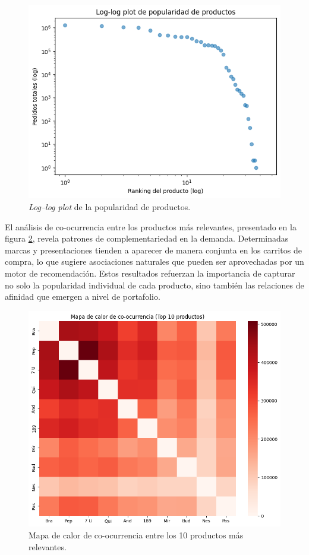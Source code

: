 \begin{figure}[htpb]
	\centering
	\includegraphics[scale=.65]{./Figures/log_log_plot.png}
	\caption{\textit{Log–log plot} de la popularidad de productos.}
	\label{fig:log_log_plot}
\end{figure}

El análisis de co-ocurrencia entre los productos más relevantes, presentado en la figura \ref{fig:heatmap_coocurrencia}, revela patrones de complementariedad en la demanda. Determinadas marcas y presentaciones tienden a aparecer de manera conjunta en los carritos de compra, lo que sugiere asociaciones naturales que pueden ser aprovechadas por un motor de recomendación. Estos resultados refuerzan la importancia de capturar no solo la popularidad individual de cada producto, sino también las relaciones de afinidad que emergen a nivel de portafolio.

\begin{figure}[htpb]
	\centering
	\includegraphics[scale=.5]{./Figures/heatmap_coocurrencia.png}
	\caption{Mapa de calor de co-ocurrencia entre los 10 productos más relevantes.}
	\label{fig:heatmap_coocurrencia}
\end{figure}

